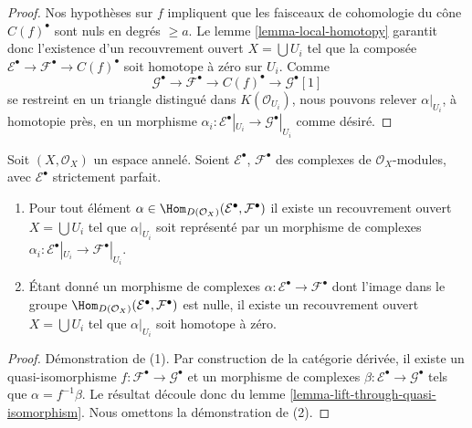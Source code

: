 {\begin{proof}

Nos hypothèses sur $f$ impliquent que les faisceaux de cohomologie du cône $C(f)^\bullet$ sont nuls en degrés $\geq a$. Le lemme \ref{lemma-local-homotopy} garantit donc l'existence d'un recouvrement ouvert $X = \bigcup U_i$ tel que la composée
$\mathcal{E}^\bullet \to \mathcal{F}^\bullet \to C(f)^\bullet$
soit homotope à zéro sur $U_i$. Comme
$$
\mathcal{G}^\bullet \to \mathcal{F}^\bullet \to C(f)^\bullet \to
\mathcal{G}^\bullet[1]
$$
se restreint en un triangle distingué dans $K(\mathcal{O}_{U_i})$,
nous pouvons relever $\alpha|_{U_i}$, à homotopie près, en un morphisme
$\alpha_i : \mathcal{E}^\bullet|_{U_i} \to \mathcal{G}^\bullet|_{U_i}$
comme désiré.

\end{proof}

\begin{lemma}

\label{lemma-local-actual}

Soit $(X, \mathcal{O}_X)$ un espace annelé. Soient $\mathcal{E}^\bullet$, $\mathcal{F}^\bullet$ des complexes de $\mathcal{O}_X$-modules, avec $\mathcal{E}^\bullet$ strictement parfait.

\begin{enumerate}

\item Pour tout élément
$\alpha \in \Hom_{D(\mathcal{O}_X)}(\mathcal{E}^\bullet, \mathcal{F}^\bullet)$
il existe un recouvrement ouvert $X = \bigcup U_i$ tel que
$\alpha|_{U_i}$ soit représenté par un morphisme de complexes
$\alpha_i : \mathcal{E}^\bullet|_{U_i} \to \mathcal{F}^\bullet|_{U_i}$.
\item Étant donné un morphisme de complexes
$\alpha : \mathcal{E}^\bullet \to \mathcal{F}^\bullet$
dont l'image dans le groupe
$\Hom_{D(\mathcal{O}_X)}(\mathcal{E}^\bullet, \mathcal{F}^\bullet)$
est nulle, il existe un recouvrement ouvert $X = \bigcup U_i$ tel que
$\alpha|_{U_i}$ soit homotope à zéro.

\end{enumerate}

\end{lemma}

\begin{proof}
Démonstration de (1). Par construction de la catégorie dérivée, il existe un quasi-isomorphisme $f : \mathcal{F}^\bullet \to \mathcal{G}^\bullet$ et un morphisme de complexes $\beta : \mathcal{E}^\bullet \to \mathcal{G}^\bullet$ tels que $\alpha = f^{-1}\beta$. Le résultat découle donc du lemme \ref{lemma-lift-through-quasi-isomorphism}. Nous omettons la démonstration de (2).
\end{proof}

}
